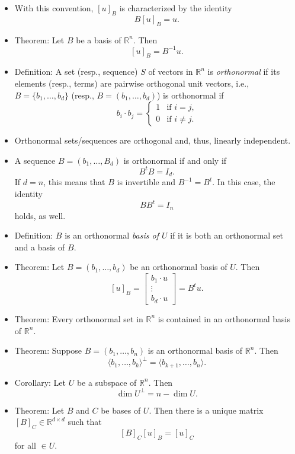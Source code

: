 \documentclass{amsart}
\newcommand{\RR}{\mathbb{R}}
\begin{document}
\begin{itemize}
  \item With this convention, $[u]_B$ is characterized by the identity
  \[B[u]_B=u.\]

  \item Theorem: Let $B$ be a basis of $\RR^n$. Then
  \[[u]_B = B^{-1}u.\]

  \item Definition: A set (resp., sequence) $S$ of vectors in $\RR^n$ is \emph{orthonormal} if its elements (resp., terms) are pairwise orthogonal unit vectors,
  i.e., $B=\{b_1,\ldots,b_d\}$ (resp., $B=(b_1,\ldots,b_d)$) is orthonormal if 
  \[
    b_i\cdot b_j=\begin{cases}
      1&\text{if $i=j$,}\\
      0&\text{if $i\neq j$.}
    \end{cases}
    \]

  \item Orthonormal sets/sequences are orthogonal and, thus, linearly independent.

  \item A sequence $B=(b_1,\ldots,B_d)$ is orthonormal if and only if 
  \[B^tB=I_d.\]
  If $d=n$, this means that $B$ is invertible and $B^{-1}=B^t$. In this case, the identity
  \[
  BB^t=I_n
  \]
  holds, as well.

  \item Definition: $B$ is an orthonormal \emph{basis of $U$} if it is both an orthonormal set and a basis of $B$.
   
  \item Theorem: Let $B=(b_1,\ldots,b_d)$ be an orthonormal basis of $U$. Then
  \[
  [u]_B = \begin{bmatrix}b_1\cdot u\\\vdots\\b_d\cdot u\end{bmatrix} = B^tu.
  \]


  \item Theorem: Every orthonormal set in $\RR^n$ is contained in an orthonormal basis of $\RR^n$.

  \item Theorem: Suppose $B=(b_1,\ldots,b_n)$ is an orthonormal basis of $\RR^n$. Then 
  \[
  \langle b_1,\ldots,b_k\rangle^\perp = \langle b_{k+1},\ldots,b_n\rangle.  
  \]

  \item Corollary: Let $U$ be a subspace of $\RR^n$. Then 
  \[
   \dim U^\perp =  n - \dim U.
  \]

  \item Theorem: Let $B$ and $C$ be bases of $U$. Then there is a unique matrix $[B]_C\in\RR^{d\times d}$ such that
  \[[B]_C[u]_B = [u]_C\] for all $\in U$.


\end{itemize}
\end{document}

